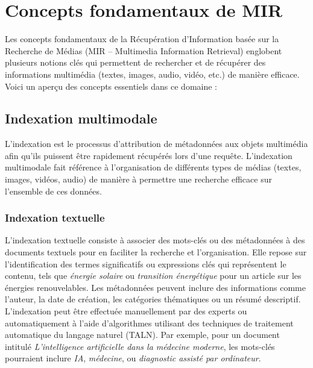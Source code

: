 
\begin{section}

 \chapter{Concepts fondamentaux de MIR}

 Les concepts fondamentaux de la Récupération d'Information basée sur la
 Recherche de Médias (MIR -- Multimedia Information Retrieval) englobent
 plusieurs notions clés qui permettent de rechercher et de récupérer des
 informations multimédia (textes, images, audio, vidéo, etc.) de manière
 efficace. Voici un aperçu des concepts essentiels dans ce domaine :

 \section{Indexation multimodale}

 L'indexation est le processus d'attribution de métadonnées aux objets
 multimédia afin qu'ils puissent être rapidement récupérés lors d'une requête.
 L'indexation multimodale fait référence à l'organisation de différents types de
 médias (textes, images, vidéos, audio) de manière à permettre une recherche
 efficace sur l'ensemble de ces données.

 \subsection{Indexation textuelle}

 L’indexation textuelle consiste à associer des mots-clés ou des métadonnées à
 des documents textuels pour en faciliter la recherche et l’organisation. Elle
 repose sur l’identification des termes significatifs ou expressions clés qui
 représentent le contenu, tels que \emph{énergie solaire} ou \emph{transition
   énergétique} pour un article sur les énergies renouvelables. Les métadonnées
 peuvent inclure des informations comme l’auteur, la date de création, les
 catégories thématiques ou un résumé descriptif. L’indexation peut être
 effectuée manuellement par des experts ou automatiquement à l’aide
 d’algorithmes utilisant des techniques de traitement automatique du langage
 naturel (TALN). Par exemple, pour un document intitulé \emph{L'intelligence
   artificielle dans la médecine moderne}, les mots-clés pourraient inclure
 \emph{IA}, \emph{médecine}, ou \emph{diagnostic assisté par ordinateur}.


\end{section}
